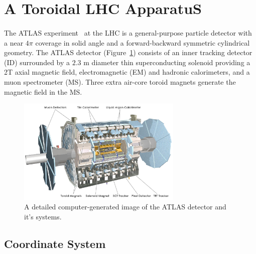 \section{A Toroidal LHC ApparatuS}
\label{sec:ATLAS}

\paragraph{}
The ATLAS experiment~\cite{PERF-2007-01} at the LHC is a general-purpose particle detector with a near $4\pi$ coverage in solid angle and a forward-backward symmetric cylindrical geometry. 
The ATLAS detector (Figure~\ref{fig:ATLAS}) consists of an inner tracking detector (ID) surrounded by a $2.3$ m diameter thin superconducting solenoid providing a 2T axial magnetic field, electromagnetic (EM) and hadronic calorimeters, and a muon spectrometer (MS). Three extra air-core toroid magnets generate the magnetic field in the MS. 

\begin{figure}[htbp!]
  \centering
  \captionsetup{justification=centering}
  \includegraphics[width=0.7\textwidth]{figures/detector/ATLAS.jpg}
   \caption{A detailed computer-generated image of the ATLAS detector and it's systems.}
  \label{fig:ATLAS}
\end{figure}

\subsection{Coordinate System}
\label{sec:ATLAS-coord}
